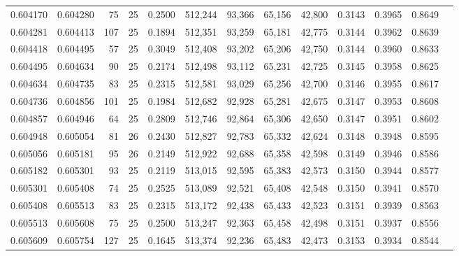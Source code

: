 \begin{tabular}{rrrrrrrrrrrrr}
0.604170 & 0.604280 &    75 &  25 &                                     0.2500 & 512,244 &  93,366 &  65,156 &  42,800 & 0.3143 & 0.3965 & 0.8649 \\
0.604281 & 0.604413 &   107 &  25 &                                     0.1894 & 512,351 &  93,259 &  65,181 &  42,775 & 0.3144 & 0.3962 & 0.8639 \\
0.604418 & 0.604495 &    57 &  25 &                                     0.3049 & 512,408 &  93,202 &  65,206 &  42,750 & 0.3144 & 0.3960 & 0.8633 \\
0.604495 & 0.604634 &    90 &  25 &                                     0.2174 & 512,498 &  93,112 &  65,231 &  42,725 & 0.3145 & 0.3958 & 0.8625 \\
0.604634 & 0.604735 &    83 &  25 &                                     0.2315 & 512,581 &  93,029 &  65,256 &  42,700 & 0.3146 & 0.3955 & 0.8617 \\
0.604736 & 0.604856 &   101 &  25 &                                     0.1984 & 512,682 &  92,928 &  65,281 &  42,675 & 0.3147 & 0.3953 & 0.8608 \\
0.604857 & 0.604946 &    64 &  25 &                                     0.2809 & 512,746 &  92,864 &  65,306 &  42,650 & 0.3147 & 0.3951 & 0.8602 \\
0.604948 & 0.605054 &    81 &  26 &                                     0.2430 & 512,827 &  92,783 &  65,332 &  42,624 & 0.3148 & 0.3948 & 0.8595 \\
0.605056 & 0.605181 &    95 &  26 &                                     0.2149 & 512,922 &  92,688 &  65,358 &  42,598 & 0.3149 & 0.3946 & 0.8586 \\
0.605182 & 0.605301 &    93 &  25 &                                     0.2119 & 513,015 &  92,595 &  65,383 &  42,573 & 0.3150 & 0.3944 & 0.8577 \\
0.605301 & 0.605408 &    74 &  25 &                                     0.2525 & 513,089 &  92,521 &  65,408 &  42,548 & 0.3150 & 0.3941 & 0.8570 \\
0.605408 & 0.605513 &    83 &  25 &                                     0.2315 & 513,172 &  92,438 &  65,433 &  42,523 & 0.3151 & 0.3939 & 0.8563 \\
0.605513 & 0.605608 &    75 &  25 &                                     0.2500 & 513,247 &  92,363 &  65,458 &  42,498 & 0.3151 & 0.3937 & 0.8556 \\
0.605609 & 0.605754 &   127 &  25 &                                     0.1645 & 513,374 &  92,236 &  65,483 &  42,473 & 0.3153 & 0.3934 & 0.8544 \\

\end{tabular}
